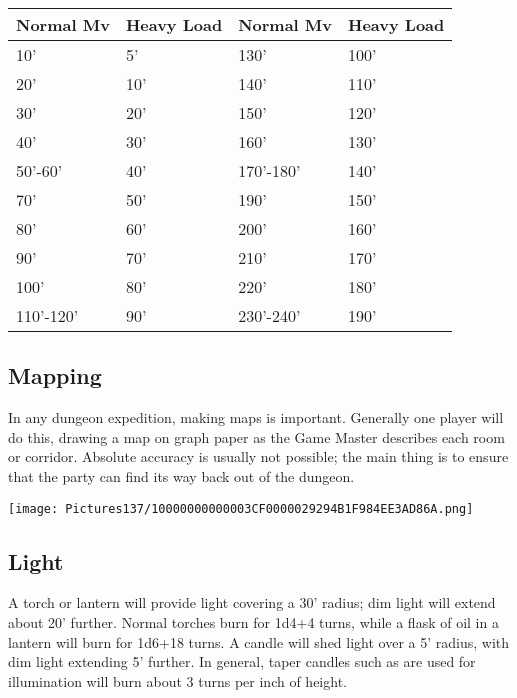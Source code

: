 \documentclass[a4paper,twoside,openany,10pt]{book}
\begin{document}
\begin{multicols}{2}
\begin{flushleft}
	\begin{tabularx}{0.47\textwidth}{@{}ll|ll@{}}
\textbf{Normal Mv}&\textbf{Heavy Load}&\textbf{Normal Mv}&\textbf{Heavy Load}\\\toprule
10' & 5' &  130' &100' \\\hline
20' & 10' &  140' &110' \\\hline
30' & 20' &  150' &120' \\\hline
40' & 30' &  160' &130' \\\hline
50'-60' & 40' &170'-180' & 140' \\\hline
70' & 50' &  190' &150' \\\hline
80' & 60' &  200' &160' \\\hline
90' & 70' &  210' &170' \\\hline
100' & 80' &  220' &180' \\\hline
110'-120' & 90'  &230'-240' & 190' \\\bottomrule
\end{tabularx}
\end{flushleft}

\subsection{Mapping}\label{mapping}

In any dungeon expedition, making maps is important. Generally one player will do this, drawing a map on graph paper as the Game Master describes each room or corridor. Absolute accuracy is usually not possible; the main thing is to ensure that the party can find its way back out of the dungeon.

\begin{flushleft}
	\texttt{[image: Pictures137/10000000000003CF0000029294B1F984EE3AD86A.png]}
\end{flushleft}

\subsection{Light}\label{light}

A torch or lantern will provide light covering a 30' radius; dim light will extend about 20' further. Normal torches burn for 1d4+4 turns, while a flask of oil in a lantern will burn for 1d6+18 turns. A candle will shed light over a 5' radius, with dim light extending 5' further. In general, taper candles such as are used for illumination will burn about 3 turns per inch of height.


\end{multicols}
\end{document}
